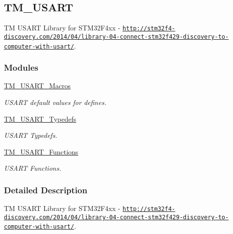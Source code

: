 \hypertarget{group___t_m___u_s_a_r_t}{}\subsection{T\+M\+\_\+\+U\+S\+A\+R\+T}
\label{group___t_m___u_s_a_r_t}


T\+M U\+S\+A\+R\+T Library for S\+T\+M32\+F4xx -\/ \href{http://stm32f4-discovery.com/2014/04/library-04-connect-stm32f429-discovery-to-computer-with-usart/}{\tt http\+://stm32f4-\/discovery.\+com/2014/04/library-\/04-\/connect-\/stm32f429-\/discovery-\/to-\/computer-\/with-\/usart/}.  


\subsubsection*{Modules}
\begin{DoxyCompactItemize}
\item 
\hyperlink{group___t_m___u_s_a_r_t___macros}{T\+M\+\_\+\+U\+S\+A\+R\+T\+\_\+\+Macros}
\begin{DoxyCompactList}\small\item\em U\+S\+A\+R\+T default values for defines. \end{DoxyCompactList}\item 
\hyperlink{group___t_m___u_s_a_r_t___typedefs}{T\+M\+\_\+\+U\+S\+A\+R\+T\+\_\+\+Typedefs}
\begin{DoxyCompactList}\small\item\em U\+S\+A\+R\+T Typedefs. \end{DoxyCompactList}\item 
\hyperlink{group___t_m___u_s_a_r_t___functions}{T\+M\+\_\+\+U\+S\+A\+R\+T\+\_\+\+Functions}
\begin{DoxyCompactList}\small\item\em U\+S\+A\+R\+T Functions. \end{DoxyCompactList}\end{DoxyCompactItemize}


\subsubsection{Detailed Description}
T\+M U\+S\+A\+R\+T Library for S\+T\+M32\+F4xx -\/ \href{http://stm32f4-discovery.com/2014/04/library-04-connect-stm32f429-discovery-to-computer-with-usart/}{\tt http\+://stm32f4-\/discovery.\+com/2014/04/library-\/04-\/connect-\/stm32f429-\/discovery-\/to-\/computer-\/with-\/usart/}. 


